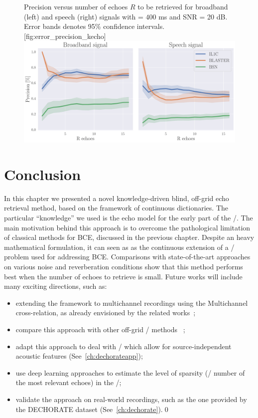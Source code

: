 \begin{figure}[t!]
    \begin{sidecaption}[]{
        Precision versus number of echoes $R$ to be retrieved for broadband (left) and speech (right) signals with \RT{} = $400$ ms and SNR = 20 dB.
        Error bands denotes 95\% confidence intervals.
    }[fig:error_precision_kecho]
    \centering
    \includegraphics[width=\linewidth]{figures/blaster/p_k-7_thr-2_bns_crocco_blaster-peak_withRechoes.pdf}
    \end{sidecaption}
\end{figure}

\section{Conclusion}
In this chapter we presented a novel knowledge-driven blind, off-grid echo retrieval method, based on the framework of continuous dictionaries.
The particular ``knowledge'' we used is the echo model for the early part of the \RIRs/.
The main motivation behind this approach is to overcome the pathological limitation of classical methods for \ac{BCE}, discussed in the previous chapter.
Despite an heavy mathematical formulation, it can seen as as the continuous extension of a \LASSO/ problem used for addressing \ac{BCE}.
Comparisons with state-of-the-art approaches on various noise and reverberation conditions show that this method performs best when the number of echoes to retrieve is small.
Future works will include many exciting directions, such as:
\begin{itemize}
    \item extending the framework to multichannel recordings using the Multichannel cross-relation, as already envisioned by the related works~;
    \item compare this approach with other off-grid \AER/ methods  ~;
    \item adapt this approach to deal with \ReTF/ which allow for source-independent acoustic features (See~\cref{ch:dechorateapp});
    \item use deep learning approaches to estimate the level of sparsity (\aka/ number of the most relevant echoes) in the \RIRs/;
    \item validate the approach on real-world recordings, such as the one provided by the \ac{DECHORATE} dataset (See~\cref{ch:dechorate}).\qed
\end{itemize}